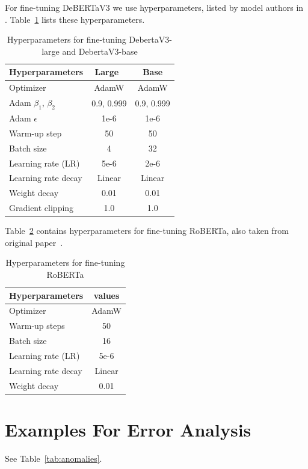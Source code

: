 \documentclass[11pt]{article}
\begin{document}
For fine-tuning DeBERTaV3 we use hyperparameters, listed by model authors in \citet{he2021debertav3}. Table~\ref{tab:hyperparameters_large} lists these hyperparameters.
\begin{table}[!htb]
\centering
\begin{tabular}{lcc}
\hline
\textbf{Hyperparameters} & \textbf{Large}\ &  \textbf{Base}\\
\hline
Optimizer & AdamW & AdamW\\
Adam $\beta_1$, $\beta_2$ & 0.9, 0.999 & 0.9, 0.999\\ 
Adam $\epsilon$ & 1e-6 & 1e-6 \\ 
Warm-up step & 50 & 50\\
Batch size & 4 & 32 \\
Learning rate (LR) & 5e-6 & 2e-6 \\
Learning rate decay & Linear & Linear \\
Weight decay & 0.01 & 0.01 \\
Gradient clipping & 1.0 & 1.0 \\
\hline
\end{tabular}
\caption{Hyperparameters for fine-tuning DebertaV3-large and DebertaV3-base}
\label{tab:hyperparameters_large}
\end{table}

Table~\ref{tab:hyperparameters_roberta} contains hyperparameters for fine-tuning RoBERTa, also taken from original paper~\cite{roberta}.
\begin{table}[!htb]
\centering
\begin{tabular}{lc}
\hline
\textbf{Hyperparameters} & \textbf{values}\\
\hline
Optimizer & AdamW \\
Warm-up steps & 50 \\
Batch size & 16 \\
Learning rate (LR) & 5e-6 \\
Learning rate decay & Linear \\
Weight decay & 0.01 \\
\hline
\end{tabular}
\caption{Hyperparameters for fine-tuning RoBERTa}
\label{tab:hyperparameters_roberta}
\end{table}


\section{Examples For Error Analysis}
\label{appendix:errors}
See Table~\ref{tab:anomalies}.
\end{document}
